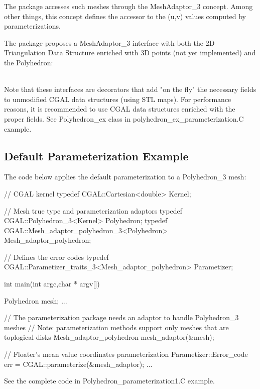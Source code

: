The package accesses such meshes through the MeshAdaptor\_3 concept. Among other
things, this concept defines the accessor to the (u,v) values computed
by parameterizations.

The package proposes
a MeshAdaptor\_3 interface with both the 2D Triangulation Data Structure enriched
with 3D points (not yet implemented) and the Polyhedron:

  \\

Note that these interfaces are decorators that add "on the fly" the necessary
fields to unmodified CGAL data structures (using STL maps).
For performance reasons, it is recommended to use CGAL data structures
enriched with the proper fields.
See Polyhedron\_ex class in polyhedron\_ex\_parameterization.C example.


\subsection{Default Parameterization Example}

The code below applies the default parameterization to a Polyhedron\_3 mesh:

\begin{ccExampleCode}

// CGAL kernel
typedef CGAL::Cartesian<double>                             Kernel;

// Mesh true type and parameterization adaptors
typedef CGAL::Polyhedron_3<Kernel>                          Polyhedron;
typedef CGAL::Mesh_adaptor_polyhedron_3<Polyhedron>         Mesh_adaptor_polyhedron;

// Defines the error codes
typedef CGAL::Parametizer_traits_3<Mesh_adaptor_polyhedron> Parametizer;

int main(int argc,char * argv[])
{
    Polyhedron mesh;
    ...

    // The parameterization package needs an adaptor to handle Polyhedron_3 meshes
    // Note: parameterization methods support only meshes that are toplogical disks
    Mesh_adaptor_polyhedron mesh_adaptor(&mesh);

    // Floater's mean value coordinates parameterization
    Parametizer::Error_code err = CGAL::parameterize(&mesh_adaptor);
    ...
}

\end{ccExampleCode}

See the complete code in Polyhedron\_parameterization1.C example.


